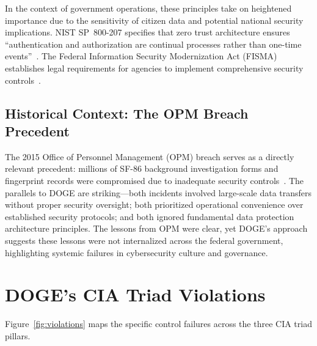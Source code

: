 \documentclass[sigconf,nonacm]{acmart}
\begin{document}
In the context of government operations, these principles take on heightened importance
due to the sensitivity of citizen data and potential national security implications.
NIST SP~800-207 specifies that zero trust architecture ensures ``authentication and
authorization are continual processes rather than one-time events''~\cite{nist800207}.
The Federal Information Security Modernization Act (FISMA) establishes legal
requirements for agencies to implement comprehensive security controls~\cite{cms2025}.

\subsection{Historical Context: The OPM Breach Precedent}

The 2015 Office of Personnel Management (OPM) breach serves as a directly relevant
precedent: millions of SF-86 background investigation forms and fingerprint records
were compromised due to inadequate security controls~\cite{fruhlinger2020}. The
parallels to DOGE are striking---both incidents involved large-scale data transfers
without proper security oversight; both prioritized operational convenience over
established security protocols; and both ignored fundamental data protection
architecture principles. The lessons from OPM were clear, yet DOGE's approach
suggests these lessons were not internalized across the federal government, highlighting
systemic failures in cybersecurity culture and governance.

\section{DOGE's CIA Triad Violations}

Figure~\ref{fig:violations} maps the specific control failures across the three CIA
triad pillars.
\end{document}
